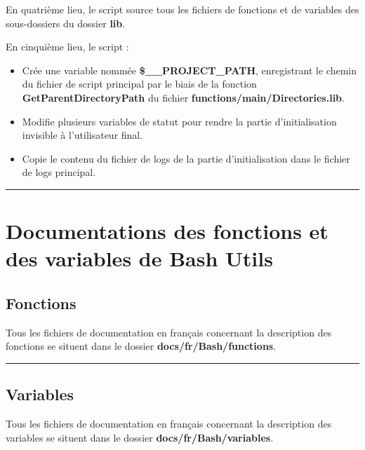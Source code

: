 \documentclass[a4paper,10pt]{article}
\begin{document}
En quatrième lieu, le script source tous les fichiers de fonctions et de variables des sous-dossiers du dossier \color{lime}\textbf{lib}\color{white}.

En cinquième lieu, le script :
\begin{itemize}
    \item Crée une variable nommée \color{orange}\textbf{\$\_\_PROJECT\_PATH}\color{white}, enregistrant le chemin du fichier de script principal par le biais de la fonction \color{mauve}\textbf{GetParentDirectoryPath} \color{white} du fichier \color{lime}\textbf{functions/main/Directories.lib}\color{white}.
    
    \item Modifie plusieurs variables de statut pour rendre la partie d'initialisation invisible à l'utilisateur final.
    
    \item Copie le contenu du fichier de logs de la partie d'initialisation dans le fichier de logs principal.\\[1\baselineskip]
\end{itemize}

\color{red}\par\noindent\rule{\textwidth}{0.4pt}\color{white}

\color{red}
\section{Documentations des fonctions et des variables de Bash Utils}\color{white}

\color{green}
\subsection{Fonctions}\color{white}
Tous les fichiers de documentation en français concernant la description des fonctions se situent dans le dossier \color{lime}\textbf{docs/fr/Bash/functions}\color{white}.\\[1\baselineskip]



\color{green}\par\noindent\rule{\textwidth}{0.4pt}\color{white}

\color{green}
\subsection{Variables}\color{white}
Tous les fichiers de documentation en français concernant la description des variables se situent dans le dossier \color{lime}\textbf{docs/fr/Bash/variables}\color{white}.\\[1\baselineskip]
\end{document}
